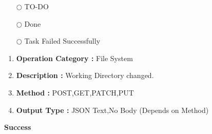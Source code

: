 \documentclass[a4paper,11pt]{texMemo}
\begin{document}
\begin{itemize}
\item[{\color{maincol}$\bigcirc$}]
TO-DO
\item[{\color{thirdcol}\rlap{\raisebox{0.2ex}{\hspace{0.6ex}\tiny \ding{52}}}}{\color{maincol}$\bigcirc$}]
Done
\item[{\color{thirdcol}\rlap{\raisebox{0.05ex}{\hspace{0.55ex}\scriptsize \ding{56}}}}{\color{maincol}$\bigcirc$}]
Task Failed Successfully
\end{itemize}
\decorativeline\bigskip{}
\begin{Abstract}[Questions]
\begin{enumerate}
    \item \textbf{Operation Category :} File System
    \item \textbf{Description :} Working Directory changed.
    \item \textbf{Method :} POST,GET,PATCH,PUT
    \item \textbf{Output Type :} JSON Text,No Body (Depends on Method)
\end{enumerate}
    \tcblower
        \textbf{Success \faCheckCircle}
\end{Abstract}

\decorativeline\bigskip{}

\lipsum
\end{document}
